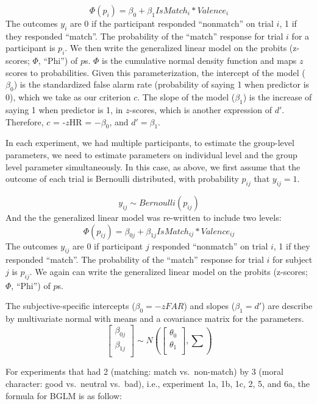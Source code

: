 \documentclass[
  english,
  man]{apa6}
\begin{document}
\[ \Phi(p_{i}) =  \beta_{0} + \beta_{1}IsMatch_{i}  * Valence_{i} \]
The outcomes \(y_{i}\) are 0 if the participant responded \enquote{nonmatch} on trial \(i\), 1 if they responded \enquote{match}. The probability of the \enquote{match} response for trial \(i\) for a participant is \(p_{i}\). We then write the generalized linear model on the probits (z-scores; \(\Phi\), \enquote{Phi}) of \(p\)s. \(\Phi\) is the cumulative normal density function and maps \(z\) scores to probabilities. Given this parameterization, the intercept of the model (\(\beta_0\)) is the standardized false alarm rate (probability of saying 1 when predictor is 0), which we take as our criterion \(c\). The slope of the model (\(\beta_1\)) is the increase of saying 1 when predictor is 1, in \(z\)-scores, which is another expression of \(d'\). Therefore, \(c\) = -\(z\)HR = \(-\beta_0\), and \(d' = \beta_1\).

In each experiment, we had multiple participants, to estimate the group-level parameters, we need to estimate parameters on individual level and the group level parameter simultaneously. In this case, as above, we first assume that the outcome of each trial is Bernoulli distributed, with probability \(p_{ij}\) that \(y_{ij} = 1\).

\[ y_{ij} \sim Bernoulli(p_{ij})\]
And the the generalized linear model was re-written to include two levels:
\[ \Phi(p_{ij}) =  \beta_{0j} + \beta_{1j}IsMatch_{ij} * Valence_{ij}\]
The outcomes \(y_{ij}\) are 0 if participant \(j\) responded \enquote{nonmatch} on trial \(i\), 1 if they responded \enquote{match}. The probability of the \enquote{match} response for trial \(i\) for subject \(j\) is \(p_{ij}\). We again can write the generalized linear model on the probits (z-scores; \(\Phi\), \enquote{Phi}) of \(p\)s.

The subjective-specific intercepts (\(\beta_{0} = -zFAR\)) and slopes (\(\beta_{1} = d'\)) are describe by multivariate normal with means and a covariance matrix for the parameters.
\[ \begin{bmatrix}\beta_{0j}\\
\beta_{1j}\\
\end{bmatrix} \sim N(\begin{bmatrix}\theta_{0}\\
\theta_{1}\\
\end{bmatrix}, \sum) \]

For experiments that had 2 (matching: match vs.~non-match) by 3 (moral character: good vs.~neutral vs.~bad), i.e., experiment 1a, 1b, 1c, 2, 5, and 6a, the formula for BGLM is as follow:
\end{document}
